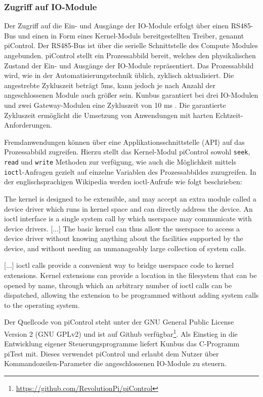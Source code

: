 \subsubsection{Zugriff auf IO-Module%
        \label{sec:2-io}}
Der Zugriff auf die Ein- und Ausgänge der IO-Module erfolgt über einen RS485-Bus und einen in Form eines Kernel-Moduls bereitgestellten Treiber, genannt piControl. Der RS485-Bus ist über die serielle Schnittstelle des Compute Modules angebunden. 
piControl stellt ein Prozessabbild bereit, welches den physikalischen Zustand der Ein- und Ausgänge der IO-Module repräsentiert.
Das Prozessabbild wird, wie in der Automatisierungstechnik üblich, zyklisch aktualisiert. 
Die angestrebte Zykluszeit beträgt 5ms, kann jedoch je nach Anzahl der angeschlossenen Module auch größer sein. 
Kunbus garantiert bei drei IO-Modulen und zwei Gateway-Modulen eine Zykluszeit von 10 ms \citep[vgl.][]{web-revpi-dio}.
Die garantierte Zykluszeit ermöglicht die Umsetzung von Anwendungen mit harten Echtzeit-Anforderungen.

Fremdanwendungen können über eine Applikationsschnittstelle (API) auf das Prozessabbild zugreifen. 
Hierzu stellt das Kernel-Modul piControl sowohl \lstinline{seek}, \lstinline{read} und \lstinline{write} Methoden zur verfügung, wie auch die Möglichkeit mittels \lstinline{ioctl}-Anfragen gezielt auf einzelne Variablen des Prozessabbildes zuzugreifen.
In der englischsprachigen Wikipedia werden ioctl-Aufrufe wie folgt beschrieben:

\glqq{}The kernel is designed to be extensible, and may accept an extra module called a device driver which runs in kernel space and can directly address the device. An ioctl interface is a single system call by which userspace may communicate with device drivers. [...] The basic kernel can thus allow the userspace to access a device driver without knowing anything about the facilities supported by the device, and without needing an unmanageably large collection of system calls.

[...] ioctl calls provide a convenient way to bridge userspace code to kernel extensions. Kernel extensions can provide a location in the filesystem that can be opened by name, through which an arbitrary number of ioctl calls can be dispatched, allowing the extension to be programmed without adding system calls to the operating system.\grqq{}\citep[vgl.][]{web-wiki-ioctl}

Der Quellcode von piControl steht unter der GNU General Public License Version 2 (GNU GPLv2) und ist 
auf Github verfügbar\footnote{\url{https://github.com/RevolutionPi/piControl}}. Als Einstieg in die 
Entwicklung eigener Steuerungsprogramme liefert Kunbus das C-Programm piTest mit. Dieses verwendet 
piControl und erlaubt dem Nutzer über Kommandozeilen-Parameter die angeschlossenen IO-Module zu steuern.

